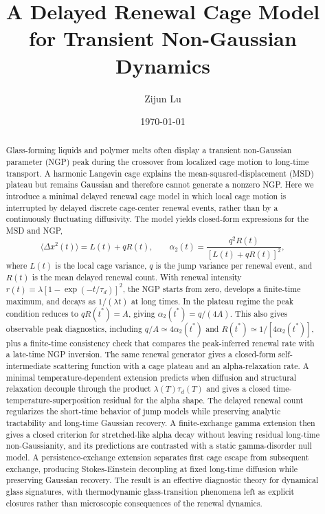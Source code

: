 \documentclass[aps,preprint,onecolumn,superscriptaddress,nofootinbib]{revtex4-2}
\begin{document}
\title{A Delayed Renewal Cage Model for Transient Non-Gaussian Dynamics}

\author{Zijun Lu}

\date{\today}

\begin{abstract}
Glass-forming liquids and polymer melts often display a transient
non-Gaussian parameter (NGP) peak during the crossover from localized cage
motion to long-time transport. A harmonic Langevin cage explains the
mean-squared-displacement (MSD) plateau but remains Gaussian and therefore
cannot generate a nonzero NGP. Here we introduce a minimal delayed renewal
cage model in which local cage motion is interrupted by delayed discrete
cage-center renewal events, rather than by a continuously fluctuating
diffusivity. The model yields closed-form expressions for the MSD and NGP,
\begin{equation}
  \langle \Delta x^2(t) \rangle = L(t)+qR(t), \qquad
  \alpha_2(t)=\frac{q^2R(t)}{[L(t)+qR(t)]^2},
\end{equation}
where $L(t)$ is the local cage variance, $q$ is the jump variance per renewal
event, and $R(t)$ is the mean delayed renewal count. With renewal intensity
$r(t)=\lambda[1-\exp(-t/\tau_d)]^2$, the NGP starts from zero, develops a
finite-time maximum, and decays as $1/(\lambda t)$ at long times. In the
plateau regime the peak condition reduces to $qR(t^\ast)=A$, giving
$\alpha_2(t^\ast)=q/(4A)$. This also gives observable peak diagnostics,
including $q/A\simeq 4\alpha_2(t^\ast)$ and
$R(t^\ast)\simeq 1/[4\alpha_2(t^\ast)]$, plus a finite-time consistency check
that compares the peak-inferred renewal rate with a late-time NGP inversion.
The same renewal generator gives a closed-form self-intermediate scattering
function with a cage plateau and an alpha-relaxation rate. A minimal
temperature-dependent extension predicts when diffusion and structural
relaxation decouple through the product $\lambda(T)\tau_d(T)$ and gives a
closed time-temperature-superposition residual for the alpha shape. The delayed
renewal count regularizes the short-time behavior of jump models while
preserving analytic tractability and long-time Gaussian recovery. A
finite-exchange gamma extension then gives a closed criterion for
stretched-like alpha decay without leaving residual long-time non-Gaussianity,
and its predictions are contrasted with a static gamma-disorder null model. A
persistence-exchange extension separates first cage escape from subsequent
exchange, producing Stokes-Einstein decoupling at fixed long-time diffusion
while preserving Gaussian recovery. The result is an effective diagnostic
theory for dynamical glass signatures, with thermodynamic glass-transition
phenomena left as explicit closures rather than microscopic consequences of
the renewal dynamics.
\end{abstract}
\end{document}
